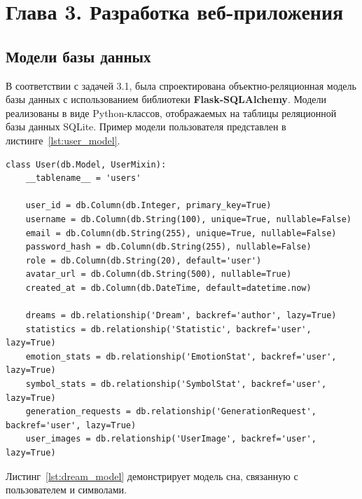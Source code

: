 \documentclass[14pt, a4paper]{extarticle}
\begin{document}
\newpage
{}
\section*{Глава 3. Разработка веб-приложения}

\subsection{Модели базы данных}

В соответствии с задачей 3.1, была спроектирована объектно-реляционная модель базы данных с использованием библиотеки \textbf{Flask-SQLAlchemy}. Модели реализованы в виде Python-классов, отображаемых на таблицы реляционной базы данных SQLite. Пример модели пользователя представлен в листинге~\ref{lst:user_model}.

\begin{lstlisting}[caption={Модель пользователя}, label={lst:user_model}]
class User(db.Model, UserMixin):
    __tablename__ = 'users'

    user_id = db.Column(db.Integer, primary_key=True)
    username = db.Column(db.String(100), unique=True, nullable=False)
    email = db.Column(db.String(255), unique=True, nullable=False)
    password_hash = db.Column(db.String(255), nullable=False)
    role = db.Column(db.String(20), default='user')
    avatar_url = db.Column(db.String(500), nullable=True)
    created_at = db.Column(db.DateTime, default=datetime.now)

    dreams = db.relationship('Dream', backref='author', lazy=True)
    statistics = db.relationship('Statistic', backref='user', lazy=True)
    emotion_stats = db.relationship('EmotionStat', backref='user', lazy=True)
    symbol_stats = db.relationship('SymbolStat', backref='user', lazy=True)
    generation_requests = db.relationship('GenerationRequest', backref='user', lazy=True)
    user_images = db.relationship('UserImage', backref='user', lazy=True)

\end{lstlisting}

Листинг~\ref{lst:dream_model} демонстрирует модель сна, связанную с пользователем и символами.
\end{document}
